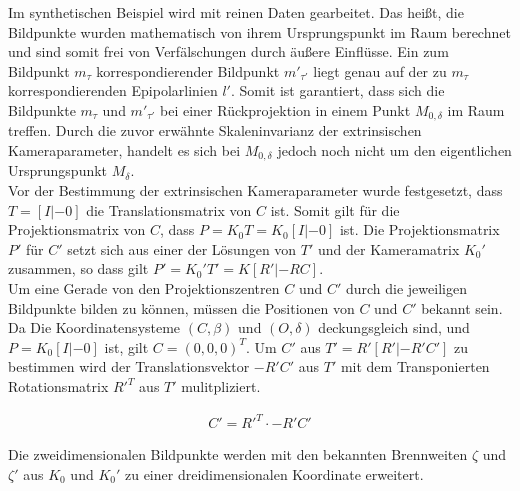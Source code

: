 Im synthetischen Beispiel wird mit reinen Daten gearbeitet. Das heißt, die Bildpunkte wurden mathematisch von ihrem Ursprungspunkt im Raum berechnet und sind somit frei von Verfälschungen durch äußere Einflüsse. Ein zum Bildpunkt $m_\tau$ korrespondierender Bildpunkt $m'_{\tau'}$ liegt genau auf der zu $m_\tau$ korrespondierenden Epipolarlinien $l'$. Somit ist garantiert, dass sich die Bildpunkte $m_\tau$ und $m'_{\tau'}$ bei einer Rückprojektion in einem Punkt $M_{0,\delta}$ im Raum treffen. Durch die zuvor erwähnte Skaleninvarianz der extrinsischen Kameraparameter, handelt es sich bei $M_{0,\delta}$ jedoch noch nicht um den eigentlichen Ursprungspunkt $M_\delta$. \\



Vor der Bestimmung der extrinsischen Kameraparameter wurde festgesetzt, dass $T = [I|-0]$ die Translationsmatrix von $C$ ist. Somit gilt für die Projektionsmatrix von $C$, dass $P= K_0T =K_0[I|-0]$ ist. Die Projektionsmatrix $P'$ für $C'$ setzt sich aus einer der Lösungen von $T'$ und der Kameramatrix $K_0'$ zusammen, so dass gilt $P'=K_0'T' = K[R'|-RC]$.\\

Um eine Gerade von den Projektionszentren $C$ und $C'$ durch die jeweiligen Bildpunkte bilden zu können, müssen die Positionen von $C$ und $C'$ bekannt sein. Da Die Koordinatensysteme $(C,\beta)$ und $(O,\delta)$ deckungsgleich sind, und $P = K_0[I|-0]$ ist, gilt $C = (0,0,0)^T$.  Um $C'$ aus $T' = R'[R'|-R'C']$ zu bestimmen wird der Translationsvektor $-R'C'$ aus $T'$ mit dem Transponierten Rotationsmatrix $R'^T$ aus $T'$ mulitpliziert.

\begin{gather}
	C' =  R'^T \cdot -R'C' 
\end{gather}

%

Die zweidimensionalen Bildpunkte werden mit den bekannten Brennweiten $\zeta$ und $\zeta'$ aus $K_0$ und $K_0'$ zu einer dreidimensionalen Koordinate erweitert.

